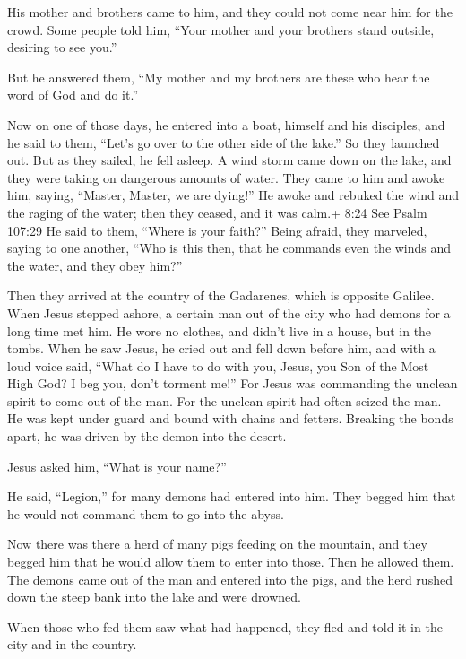  His mother and brothers came to him, and they could not
come near him for the crowd.  Some people told him, ``Your
mother and your brothers stand outside, desiring to see you.''

 But he answered them, ``My mother and my brothers are
these who hear the word of God and do it.''

 Now on one of those days, he entered into a boat, himself
and his disciples, and he said to them, ``Let's go over to the other
side of the lake.'' So they launched out.  But as they
sailed, he fell asleep. A wind storm came down on the lake, and they
were taking on dangerous amounts of water.  They came to
him and awoke him, saying, ``Master, Master, we are dying!'' He awoke
and rebuked the wind and the raging of the water; then they ceased, and
it was calm.+ 8:24 See Psalm 107:29  He said to them,
``Where is your faith?'' Being afraid, they marveled, saying to one
another, ``Who is this then, that he commands even the winds and the
water, and they obey him?''

 Then they arrived at the country of the Gadarenes, which
is opposite Galilee.  When Jesus stepped ashore, a certain
man out of the city who had demons for a long time met him. He wore no
clothes, and didn't live in a house, but in the tombs. 
When he saw Jesus, he cried out and fell down before him, and with a
loud voice said, ``What do I have to do with you, Jesus, you Son of the
Most High God? I beg you, don't torment me!''  For Jesus
was commanding the unclean spirit to come out of the man. For the
unclean spirit had often seized the man. He was kept under guard and
bound with chains and fetters. Breaking the bonds apart, he was driven
by the demon into the desert.

 Jesus asked him, ``What is your name?''

He said, ``Legion,'' for many demons had entered into him. 
They begged him that he would not command them to go into the abyss.

 Now there was there a herd of many pigs feeding on the
mountain, and they begged him that he would allow them to enter into
those. Then he allowed them.  The demons came out of the
man and entered into the pigs, and the herd rushed down the steep bank
into the lake and were drowned.

 When those who fed them saw what had happened, they fled
and told it in the city and in the country.

